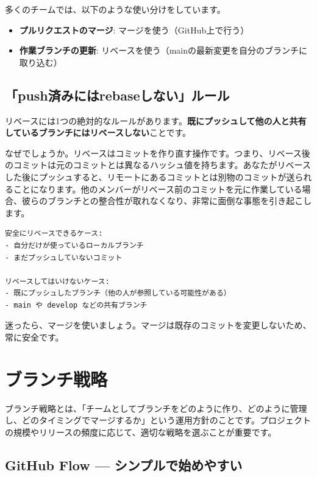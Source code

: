 多くのチームでは、以下のような使い分けをしています。

\begin{itemize}
  \item \textbf{プルリクエストのマージ}: マージを使う（GitHub上で行う）
  \item \textbf{作業ブランチの更新}: リベースを使う（mainの最新変更を自分のブランチに取り込む）
\end{itemize}

\subsection{「push済みにはrebaseしない」ルール}

リベースには1つの絶対的なルールがあります。\textbf{既にプッシュして他の人と共有しているブランチにはリベースしない}ことです。

なぜでしょうか。リベースはコミットを作り直す操作です。つまり、リベース後のコミットは元のコミットとは異なるハッシュ値を持ちます。あなたがリベースした後にプッシュすると、リモートにあるコミットとは別物のコミットが送られることになります。他のメンバーがリベース前のコミットを元に作業している場合、彼らのブランチとの整合性が取れなくなり、非常に面倒な事態を引き起こします。

\begin{lstlisting}[language={}]
安全にリベースできるケース:
- 自分だけが使っているローカルブランチ
- まだプッシュしていないコミット

リベースしてはいけないケース:
- 既にプッシュしたブランチ（他の人が参照している可能性がある）
- main や develop などの共有ブランチ
\end{lstlisting}

迷ったら、マージを使いましょう。マージは既存のコミットを変更しないため、常に安全です。

\section{ブランチ戦略}

ブランチ戦略とは、「チームとしてブランチをどのように作り、どのように管理し、どのタイミングでマージするか」という運用方針のことです。プロジェクトの規模やリリースの頻度に応じて、適切な戦略を選ぶことが重要です。

\subsection{GitHub Flow — シンプルで始めやすい}

